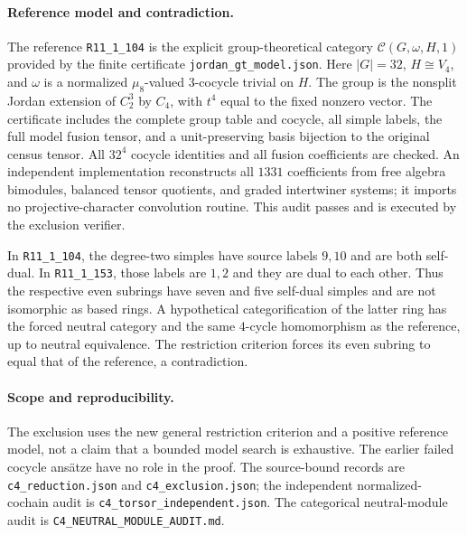 \paragraph{Reference model and contradiction.}
The reference \texttt{R11\_1\_104} is the explicit group-theoretical
category $\mathcal C(G,\omega,H,1)$ provided by the finite certificate
\texttt{jordan\_gt\_model.json}. Here $|G|=32$, $H\cong V_4$, and
$\omega$ is a normalized $\mu_8$-valued $3$-cocycle trivial on $H$.
The group is the nonsplit Jordan extension of $C_2^3$ by $C_4$,
with $t^4$ equal to the fixed nonzero vector.
The certificate includes the complete group table and cocycle,
all simple labels, the full model fusion tensor, and a unit-preserving
basis bijection to the original census tensor. All $32^4$ cocycle
identities and all fusion coefficients are checked. An independent
implementation reconstructs all $1331$ coefficients from free algebra
bimodules, balanced tensor quotients, and graded intertwiner systems;
it imports no projective-character convolution routine. This audit
passes and is executed by the exclusion verifier.

In \texttt{R11\_1\_104}, the degree-two simples have source labels
$9,10$ and are both self-dual. In \texttt{R11\_1\_153}, those labels
are $1,2$ and they are dual to each other. Thus the respective even
subrings have seven and five self-dual simples and are not isomorphic
as based rings. A hypothetical categorification of the latter ring
has the forced neutral category and the same $4$-cycle homomorphism
as the reference, up to neutral equivalence. The restriction criterion
forces its even subring to equal that of the reference, a contradiction.

\paragraph{Scope and reproducibility.}
The exclusion uses the new general restriction criterion and a positive
reference model, not a claim that a bounded model search is exhaustive.
The earlier failed cocycle ans\"atze have no role in the proof.
The source-bound records are \texttt{c4\_reduction.json} and
\texttt{c4\_exclusion.json}; the independent normalized-cochain audit is
\texttt{c4\_torsor\_independent.json}. The categorical neutral-module
audit is \texttt{C4\_NEUTRAL\_MODULE\_AUDIT.md}.
